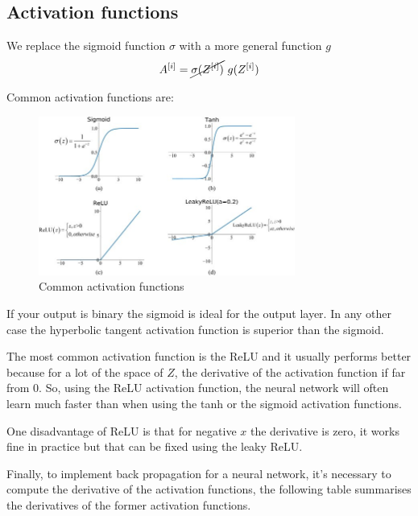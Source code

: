 \subsection*{Activation functions}

    We replace the sigmoid function $\sigma$ with a more general function $g$ 
    \begin{align*}
        A^{[i]} = \cancel{\sigma(Z^{[i]})} \ g(Z^{[i]})
    \end{align*}

    Common activation functions are:
    \begin{figure}[H]
        \begin{center}
                \includegraphics[width=0.75\textwidth]{img/activations.jpg}
                \caption{Common activation functions}
            \end{center}
    \end{figure}
    If your output is binary the sigmoid is ideal for the output layer. In any other case the
    hyperbolic tangent activation function is superior than the sigmoid.

    The most common activation function is the ReLU and it usually performs better because
    for a lot of the space of $Z$, the derivative of the activation function if far from 0.
    So, using the ReLU activation function, the neural network will often learn much faster 
    than when using the tanh or the sigmoid activation functions. 

    One disadvantage of ReLU is that for negative $x$ the derivative is zero, it works fine 
    in practice but that can be fixed using the leaky ReLU.

    Finally, to implement back propagation for a neural network, it's necessary to 
    compute the derivative of the activation functions, the following table summarises the 
    derivatives of the former activation functions.

